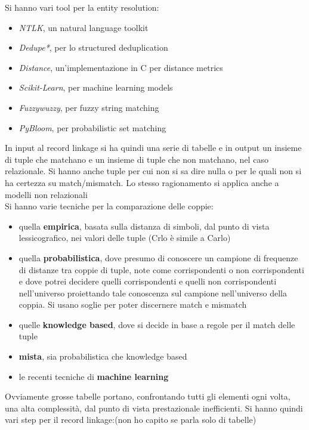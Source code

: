 Si hanno vari tool per la entity resolution:
\begin{itemize}
    \item \textit{NTLK}, un natural language toolkit
    \item \textit{Dedupe*}, per lo structured deduplication
    \item \textit{Distance}, un'implementazione in C per distance metrics
    \item \textit{Scikit-Learn}, per machine learning models
    \item \textit{Fuzzywuzzy}, per fuzzy string matching
    \item \textit{PyBloom}, per probabilistic set matching
\end{itemize}

In input al record linkage si ha quindi una serie di tabelle e in output un insieme di tuple che matchano e un insieme di tuple che non matchano, nel caso relazionale. Si hanno anche tuple per cui non si sa dire nulla o per le quali non si ha certezza su match/mismatch. Lo stesso ragionamento si applica anche a modelli non relazionali\\
Si hanno varie tecniche per la comparazione delle coppie:
\begin{itemize}
    \item quella \textbf{empirica}, basata sulla distanza di simboli, dal punto di vista lessicografico, nei valori delle tuple (Crlo è simile a Carlo)
    \item quella \textbf{probabilistica}, dove presumo di conoscere un campione di frequenze di distanze tra coppie di tuple, note come corrispondenti o non corrispondenti e dove potrei decidere quelli corrispondenti e quelli non corrispondenti nell'universo proiettando tale conoscenza sul campione nell'universo della coppia. Si usano soglie per poter discernere match e mismatch
    \item quelle \textbf{knowledge based}, dove si decide in base a regole per il match delle tuple
    \item \textbf{mista}, sia probabilistica che knowledge based 
    \item le recenti tecniche di \textbf{machine learning}
\end{itemize}
Ovviamente grosse tabelle portano, confrontando tutti gli elementi ogni volta, una alta complessità, dal punto di vista prestazionale inefficienti. Si hanno quindi vari step per il record linkage:(non ho capito se parla solo di tabelle)

